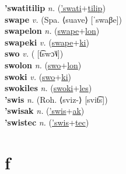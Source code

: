 \textbf{'swatitilip} \textit{n.} (\hyperref['swati]{'swati}+\hyperref[tilip]{tilip})
 \label{'swatitilip} \\
\textbf{swape} \textit{v.} (Spa. ⟨suave⟩ [ˈswaβe])
 \label{swape} \\
\textbf{swapelon} \textit{n.} (\hyperref[swape]{swape}+\hyperref[lon]{lon})
 \label{swapelon} \\
\textbf{swapeki} \textit{v.} (\hyperref[swape]{swape}+\hyperref[ki]{ki})
 \label{swapeki} \\
\textbf{swo} \textit{v.} ( [t͡swɔ˥˩])
 \label{swo} \\
\textbf{swolon} \textit{n.} (\hyperref[swo]{swo}+\hyperref[lon]{lon})
 \label{swolon} \\
\textbf{swoki} \textit{v.} (\hyperref[swo]{swo}+\hyperref[ki]{ki})
 \label{swoki} \\
\textbf{swokiles} \textit{n.} (\hyperref[swoki]{swoki}+\hyperref[les]{les})
 \label{swokiles} \\
\textbf{'swis} \textit{n.} (Roh. ⟨sviz-⟩ [svit͡s])
 \label{'swis} \\
\textbf{'swisak} \textit{n.} (\hyperref['swis]{'swis}+\hyperref[ak]{ak})
 \label{'swisak} \\
\textbf{'swistec} \textit{n.} (\hyperref['swis]{'swis}+\hyperref[tec]{tec})
 \label{'swistec} 

\section{f}


